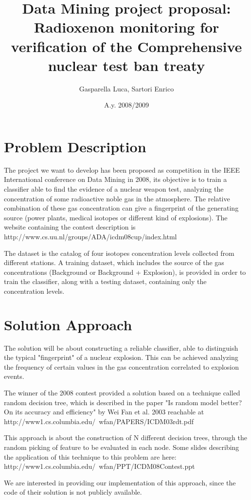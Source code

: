 \documentclass[12pt,a4paper]{article}
\title{Data Mining project proposal:\\
Radioxenon monitoring for verification of the Comprehensive nuclear test ban
treaty}
\author{Gasparella Luca, Sartori Enrico}
\date{A.y. 2008/2009}
\begin{document}
\maketitle
\section{Problem Description}
The project we want to develop has been proposed as competition in the
IEEE International conference on Data Mining in 2008, its objective is 
to train a classifier able to find the evidence of a nuclear weapon test,
analyzing the concentration of some radioactive noble gas in the atmosphere.
The relative combination of these gas concentration can give a fingerprint
of the generating source (power plants, medical isotopes or different kind
of explosions).
The website containing the contest description is 
http://www.cs.uu.nl/groups/ADA/icdm08cup/index.html

The dataset is the catalog of four isotopes concentration levels collected 
from different stations. A training dataset, which includes the source of
the gas concentrations (Background or Background + Explosion), is provided
in order to train the classifier, along with a testing dataset, containing 
only the concentration levels.

\section{Solution Approach}
The solution will be about constructing a reliable classifier, able to 
distinguish the typical "fingerprint" of a nuclear explosion. This can be
achieved analyzing the frequency of certain values in the gas concentration
correlated to explosion events.

The winner of the 2008 contest provided a solution based on a technique called
random decision tree, which is described in the paper "Is random model better?
On its accuracy and efficiency" by Wei Fan et al. 2003 reachable at 
http://www1.cs.columbia.edu/~wfan/PAPERS/ICDM03rdt.pdf

This approach is about the construction of N different decision trees, through
the random picking of feature to be evaluated in each node.
Some slides describing the application of this technique to this problem are
here: http://www1.cs.columbia.edu/~wfan/PPT/ICDM08Contest.ppt

We are interested in providing our implementation of this approach, since the
code of their solution is not publicly available. 
\end{document}
